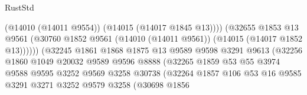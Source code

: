 \begin{lexlean}{RustStd}
\begin{coremodule}
                                              (@14010 (@14011 @9554))
                                              (@14015 (@14017 @1845 @13))))
                                          (@32655
                                            @1853
                                            @13
                                            @9561
                                            (@30760
                                              @1852
                                              @9561
                                              (@14010 (@14011 @9561))
                                              (@14015 (@14017 @1852 @13))))))
                                      (@32245
                                        @1861
                                        @1868
                                        @1875
                                        @13
                                        @9589
                                        @9598
                                        @3291
                                        @9613
                                        (@32256
                                          @1860
                                          @1049
                                          @20032
                                          @9589
                                          @9596
                                          @8888
                                          (@32265
                                            @1859
                                            @53
                                            @55
                                            @3974
                                            @9588
                                            @9595
                                            @3252
                                            @9569
                                            @3258
                                            @30738
                                            (@32264
                                              @1857
                                              @106
                                              @53
                                              @16
                                              @9585
                                              @3291
                                              @3271
                                              @3252
                                              @9579
                                              @3258
                                              (@30698
                                                @1856

\end{coremodule}
\end{lexlean}
